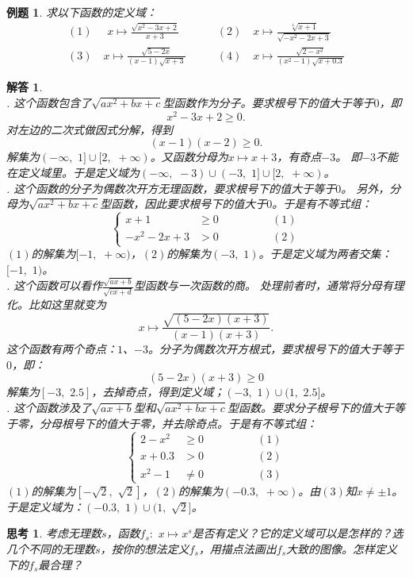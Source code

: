 \documentclass[12pt,UTF8]{ctexbook}
\newtheorem{et}{例题}[section]
\newtheorem{sk}{思考}[section]
\newtheorem*{so}{解答}
\begin{document}
\begin{et}
    求以下函数的定义域：\\
    \begin{align*}
        (1) \,\,\quad x\mapsto \frac{\sqrt{x^2 - 3x + 2}}{x + 3} \quad & \quad (2) \quad x\mapsto \frac{\sqrt[4]{x + 1}}{\sqrt{- x^2 - 2x + 3}} \\
        (3) \quad x\mapsto \frac{\sqrt{5 - 2x}}{(x - 1)\sqrt{x + 3}} \quad & \quad (4)\quad x\mapsto \frac{\sqrt{2 - x^2}}{(x^2 - 1)\sqrt{x + 0.3}}  
    \end{align*}
\end{et}
\begin{so}
    \mbox{}\\
    . 这个函数包含了$\sqrt{ax^2 + bx + c}$型函数作为分子。要求根号下的值大于等于$0$，即
    $$ x^2 - 3x + 2 \geqslant 0.$$
    对左边的二次式做因式分解，得到
    $$ (x - 1)(x - 2) \geqslant 0.$$
    解集为$(-\infty, \,\, 1]\cup[2, \,\, +\infty)$。又函数分母为$x\mapsto x + 3$，有奇点$-3$。
    即$-3$不能在定义域里。于是定义域为$(-\infty,\,\,  -3)\cup(-3, \,\, 1]\cup[2,\,\,  +\infty)$。\\
    . 这个函数的分子为偶数次开方无理函数，要求根号下的值大于等于$0$。
    另外，分母为$\sqrt{ax^2 + bx + c}$型函数，因此要求根号下的值大于$0$。于是有不等式组：
    $$\left\{\begin{array}{ccr}
        x + 1 &\geqslant 0 & \quad\quad\quad\quad (1) \\
        - x^2 - 2x + 3 &> 0  & \quad\quad\quad\quad (2)
    \end{array}\right.$$
    $(1)$的解集为$[-1,\,\, +\infty)$，$(2)$的解集为$(-3,\,\,  1)$。于是定义域为两者交集：$[-1,\,\,  1)$。\\
    . 这个函数可以看作$\frac{\sqrt{ax + b}}{\sqrt{cx + d}}$型函数与一次函数的商。
    处理前者时，通常将分母有理化。比如这里就变为
    $$ x \mapsto \frac{\sqrt{(5 - 2x)(x + 3)}}{(x - 1)(x + 3)}. $$
    这个函数有两个奇点：$1$、$-3$。分子为偶数次开方根式，要求根号下的值大于等于$0$，即：
    $$ (5 - 2x)(x + 3) \geqslant 0$$
    解集为$[-3, \,\, 2.5]$，去掉奇点，得到定义域；$(-3, \,\, 1)\cup(1, \,\, 2.5]$。\\
    . 这个函数涉及了$\sqrt{ax + b}$型和$\sqrt{ax^2 + bx + c}$型函数。要求分子根号下的值大于等于零，分母根号下的值大于零，并去除奇点。于是有不等式组：
    $$\left\{\begin{array}{ccr}
        2 - x^2 &\geqslant 0 & \quad\quad\quad\quad (1) \\
        x + 0.3 &> 0  & \quad\quad\quad\quad (2) \\
        x^2 - 1 &\neq 0 & \quad\quad\quad\quad (3) 
    \end{array}\right.$$
    $(1)$的解集为$[-\sqrt{2}, \,\, \sqrt{2}]$，$(2)$的解集为$(-0.3,\,\,  +\infty)$。由$(3)$知$x\neq \pm 1$。
    于是定义域为：$(-0.3, \,\, 1)\cup(1, \,\, \sqrt{2}]$。
\end{so}
\begin{sk}
    考虑无理数$s$，函数$f_s: \,\, x\mapsto x^s$是否有定义？它的定义域可以是怎样的？选几个不同的无理数$s$，按你的想法定义$f_s$，用描点法画出$f_s$大致的图像。怎样定义下的$f_s$最合理？
\end{sk}
\end{document}

